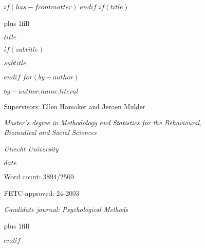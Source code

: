 $if(has-frontmatter)$
\frontmatter
$endif$
$if(title)$
\cleardoublepage
\thispagestyle{empty}
{\centering
\hbox{}\vskip 0cm plus 1fill
{\Large\bfseries $title$ \par}
$if(subtitle)$
\vspace{3ex}
{\large $subtitle$ \par}
$endif$
\vspace{9ex}
$for(by-author)$
{\large\bfseries $by-author.name.literal$ \par}
\vspace{3ex}
{\large Supervisors: Ellen Hamaker and Jeroen Mulder \par}
\vspace{9ex}
{\normalsize \textit{Master's degree in Methodology and Statistics for the Behavioural, \\ Biomedical and Social Sciences} \par}
\vspace{3ex}
{\normalsize \textit{Utrecht University} \par}
\vspace{9ex}
{\normalsize $date$ \par}
\vspace{3ex}
{\normalsize Word count: 3894/2500 \par}
\vspace{9ex}
{\normalsize FETC-approved: 24-2003 \par}
\vspace{9ex}
{\normalsize \textit{Candidate journal: Psychological Methods} \par}
\hbox{}\vskip 0cm plus 1fill
}
$endif$
